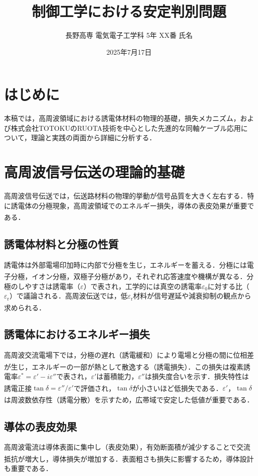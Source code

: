 \documentclass[11pt,a4paper]{ltjsarticle} %
\newcommand{\supcite}[1]{\textsuperscript{\cite{#1}}} %
\begin{document}
\title{制御工学における安定判別問題}
\author{長野高専 電気電子工学科 5年 XX番 氏名}
\date{2025年7月17日}
\maketitle
\thispagestyle{fancy}

\section{はじめに}
本稿では，高周波領域における誘電体材料の物理的基礎，損失メカニズム，および株式会社TOTOKUのRUOTA技術を中心とした先進的な同軸ケーブル応用について，理論と実践の両面から詳細に分析する．

\section{高周波信号伝送の理論的基礎}
高周波信号伝送では，伝送路材料の物理的挙動が信号品質を大きく左右する．特に誘電体の分極現象，高周波領域でのエネルギー損失，導体の表皮効果が重要である\supcite{ref1,ref2}．

\subsection{誘電体材料と分極の性質}
誘電体は外部電場印加時に内部で分極を生じ，エネルギーを蓄える．分極には電子分極，イオン分極，双極子分極があり，それぞれ応答速度や機構が異なる\supcite{ref2}．分極のしやすさは誘電率（$\varepsilon$）で表され，工学的には真空の誘電率$\varepsilon_0$に対する比（$\varepsilon_\mathrm{r}$）で議論される．高周波伝送では，低$\varepsilon_\mathrm{r}$材料が信号遅延や減衰抑制の観点から求められる\supcite{ref3}．

\subsection{誘電体におけるエネルギー損失}
高周波交流電場下では，分極の遅れ（誘電緩和）により電場と分極の間に位相差が生じ，エネルギーの一部が熱として散逸する（誘電損失）\supcite{ref1,ref4}．この損失は複素誘電率$\varepsilon^*=\varepsilon'-i\varepsilon''$で表され，$\varepsilon'$は蓄積能力，$\varepsilon''$は損失度合いを示す．損失特性は誘電正接$\tan\delta=\varepsilon''/\varepsilon'$で評価され，$\tan\delta$が小さいほど低損失である\supcite{ref4}．$\varepsilon'$，$\tan\delta$は周波数依存性（誘電分散）を示すため，広帯域で安定した低値が重要である\supcite{ref5}．

\subsection{導体の表皮効果}
高周波電流は導体表面に集中し（表皮効果），有効断面積が減少することで交流抵抗が増大し，導体損失が増加する\supcite{ref1}．表面粗さも損失に影響するため，導体設計も重要である．
\end{document}
